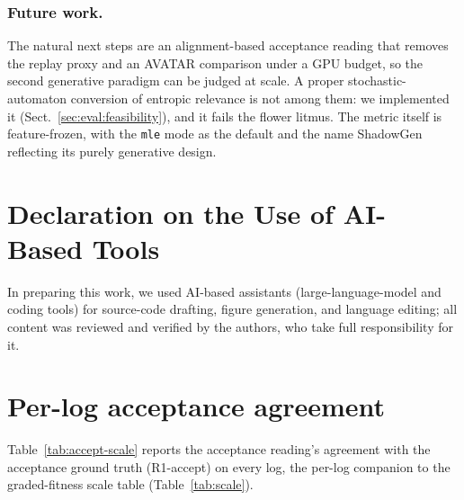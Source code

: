 \documentclass[runningheads]{llncs}
\newcommand{\chg}[1]{\textcolor{chgblue}{#1}}
\begin{document}
\subsubsection{Future work.}
\chg{The natural next steps are an alignment-based acceptance reading that removes the replay proxy and an AVATAR comparison under a GPU budget, so the second generative paradigm can be judged at scale. A proper stochastic-automaton conversion of entropic relevance is not among them: we implemented it (Sect.~\ref{sec:eval:feasibility}), and it fails the flower litmus.} The metric itself is feature-frozen, with the \texttt{mle} mode as the default and the name ShadowGen reflecting its purely generative design.

\section*{Declaration on the Use of AI-Based Tools}
In preparing this work, we used AI-based assistants (large-language-model and coding
tools) for source-code drafting, figure generation, and language editing; all content
was reviewed and verified by the authors, who take full responsibility for it.

\appendix
\section{Per-log acceptance agreement}
\label{sec:appendix:accept}
\chg{Table~\ref{tab:accept-scale} reports the acceptance reading's agreement with the acceptance ground truth (R1-accept) on every log, the per-log companion to the graded-fitness scale table (Table~\ref{tab:scale}).}
\end{document}
